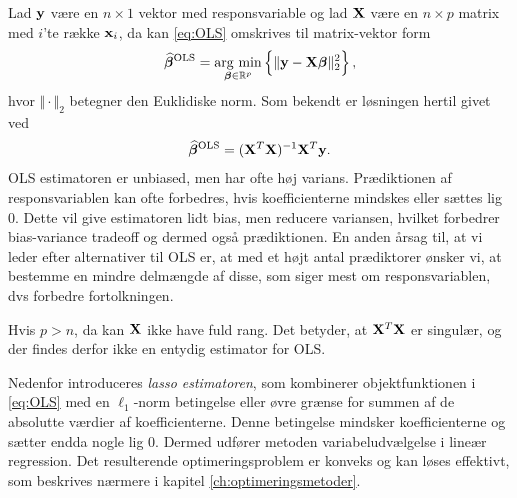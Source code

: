 Lad \(\mathbf{y}\) være en \(n \times 1\) vektor med responsvariable og lad \(\mathbf{X}\) være en $n \times p$ matrix med  \(i\)'te række $\mathbf{x}_i$, da kan \eqref{eq:OLS} omskrives til matrix-vektor form
\begin{align*}
\widehat{\tbeta}^\text{OLS} = \argmin_{ \tbeta \in \R^p} \cbr{ \Vert \y - \X \tbeta \Vert_2^2},
\end{align*}
hvor \(\Vert \cdot \Vert_2\) betegner den Euklidiske norm.
Som bekendt er løsningen hertil givet ved
\begin{align*}
\widehat{\boldsymbol{\beta}}^{\text{OLS}} = (\mathbf{X}^T \mathbf{X})^{-1} \mathbf{X}^T \mathbf{y}.
\end{align*}
OLS estimatoren er unbiased, men har ofte høj varians. 
Prædiktionen af responsvariablen kan ofte forbedres, hvis koefficienterne mindskes eller sættes lig 0.
Dette vil give estimatoren lidt bias, men reducere variansen, hvilket forbedrer bias-variance tradeoff og dermed også prædiktionen.
En anden årsag til, at vi leder efter alternativer til OLS er, at med et højt antal prædiktorer ønsker vi, at bestemme en mindre delmængde af disse, som siger mest om responsvariablen, dvs forbedre fortolkningen.

Hvis \(p > n\), da kan \(\mathbf{X}\) ikke have fuld rang.
Det betyder, at $\mathbf{X}^T \mathbf{X}$ er singulær, og der findes derfor ikke en entydig estimator for OLS.

Nedenfor introduceres \textit{lasso estimatoren}, som kombinerer objektfunktionen i \eqref{eq:OLS} med en $\ell_1$-norm betingelse eller øvre grænse for summen af de absolutte værdier af koefficienterne.
Denne betingelse mindsker koefficienterne og sætter endda nogle lig 0. 
Dermed udfører metoden variabeludvælgelse i lineær regression.
Det resulterende optimeringsproblem er konveks og kan løses effektivt, som beskrives nærmere i kapitel \ref{ch:optimeringsmetoder}.
%



%